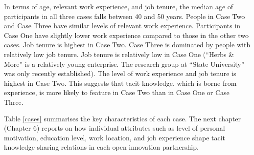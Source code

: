 In terms of age, relevant work experience, and job tenure, the median age of participants in all three cases falls between 40 and 50 years. People in Case Two and Case Three have similar levels of relevant work experience.  Participants in Case One have slightly lower work experience compared to those in the other two cases. Job tenure is highest in Case Two. Case Three is dominated by people with relatively low job tenure. Job tenure is relatively low in Case One (\enquote{Herbs \& More} is a relatively young enterprise. The research group at \enquote{State University} was only recently established). The level of work experience and job tenure is highest in Case Two. This suggests that tacit knowledge, which is borne from experience, is more likely to feature in Case Two than in Case One or Case Three. \medskip 


Table \ref{cases} summarises the key characteristics of each case. The next chapter (Chapter 6) reports on how individual attributes such as level of personal motivation, education level, work location, and job experience shape tacit knowledge sharing relations in each open innovation partnership. \medskip

